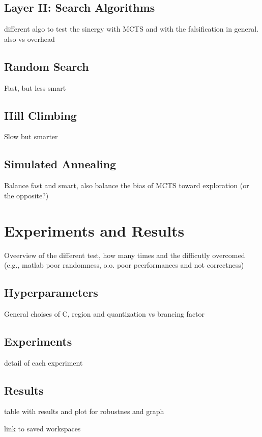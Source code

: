 \documentclass[11pt]{article}
\begin{document}
\subsection{ Layer II: Search Algorithms }
different algo to test the sinergy with MCTS and with the falsification in general. also vs overhead

\subsection{ Random Search }
Fast, but less smart
\subsection{ Hill Climbing }
Slow but smarter
\subsection{ Simulated Annealing }
Balance fast and smart, also balance the bias of MCTS toward exploration (or the opposite?)
\pagebreak

\section{ Experiments and Results }
Oveerview of the different test, how many times and the difficutly overcomed (e.g., matlab poor randomness, o.o. poor peerformances and not correctness)

\subsection{ Hyperparameters }
General choises of C, region and quantization vs brancing factor
\subsection{ Experiments }
detail of each experiment
\subsection{ Results }
table with results and plot for robustnes and graph

link to saved workspaces
\end{document}
